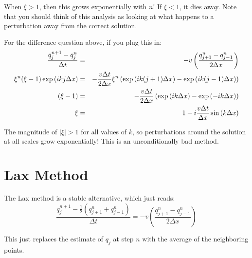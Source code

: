 
\begin{answer}
When $\xi>1$, then this grows exponentially with $n$! If $\xi < 1$, it
dies away. Note that you should think of this analysis as looking at
what happens to a perturbation away from the correct solution.
\end{answer}

For the difference question above, if you plug this in:
\begin{eqnarray}
  \frac{q_j^{n+1} - q_j^{n}}{\Delta t} &=& - v \left(
  \frac{q_{j+1}^n - q_{j-1}^n}{2\Delta x} \right) \cr
  \xi^n (\xi - 1) \exp\left( i k j \Delta x\right) &=&
  - \frac{v \Delta t}{2\Delta x} \xi^n \left(
  \exp\left(i k (j+1) \Delta x\right)  - 
  \exp\left(i k (j-1) \Delta x\right) \right) \cr
  (\xi - 1) &=&
  - \frac{v \Delta t}{2\Delta x} \left(
  \exp\left(i k \Delta x\right)  - 
  \exp\left(- i k \Delta x\right) \right) \cr
  \xi &=&
  1 - i \frac{v \Delta t}{\Delta x} 
  \sin\left(k \Delta x\right)
\end{eqnarray}


\begin{answer}
The magnitude of $|\xi|>1$ for all values of $k$, so perturbations
around the solution at all scales grow exponentially! This is an
unconditionally bad method.
\end{answer}

\section{Lax Method}

The Lax method is a stable alternative, which just reads:
\begin{equation}
  \frac{q_j^{n+1} - \frac{1}{2}\left(q_{j+1}^{n} +
    q_{j-1}^{n}\right)}{\Delta t} = - v \left(
  \frac{q_{j+1}^n - q_{j-1}^n}{2\Delta x}
  \right)
\end{equation}


\begin{answer}
This just replaces the estimate of $q_j$ at step $n$ with the average
of the neighboring points. 
\end{answer}

